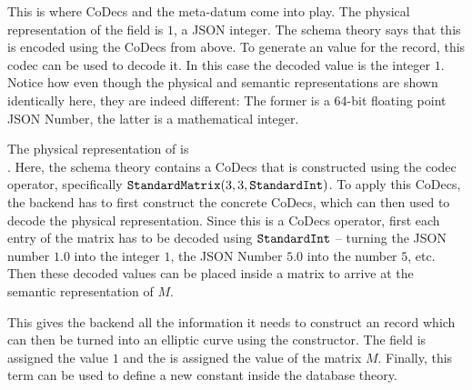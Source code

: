 This is where CoDecs and the  meta-datum come into play. 
The physical representation of the  field is $1$, a JSON integer. 
The schema theory says that this is encoded using the  CoDecs from above. 
To generate an \mmt value for the record, this codec can be used to decode it. 
In this case the decoded value is the integer $1$. 
Notice how even though the physical and semantic representations are shown identically here, they are indeed different: The former is a 64-bit floating point JSON Number, the latter is a mathematical integer. 

The physical representation of  is
\\\noindent\inlinecode{[[1.0,5.0,25.0],[5.0,1.0,5.0],[25.0,5.0,1.0]]}. 
Here, the schema theory contains a CoDecs that is constructed using the  codec operator, specifically $\plaintt{StandardMatrix}(3, 3, \plaintt{StandardInt})$. 
To apply this CoDecs, the backend has to first construct the concrete CoDecs, which can then used to decode the physical representation. 
Since this is a CoDecs operator, first each entry of the matrix has to be decoded using $\plaintt{StandardInt}$ -- turning the JSON number $1.0$ into the integer $1$, the JSON Number $5.0$ into the number $5$, etc. 
Then these decoded values can be placed inside a matrix to arrive at the semantic representation of $M$. 

This gives the backend all the information it needs to construct an \mmt record which can then be turned into an elliptic curve using the  constructor. 
The  field is assigned the value $1$ and the  is assigned the value of the matrix $M$. 
Finally, this \mmt term can be used to define a new constant inside the database theory.



